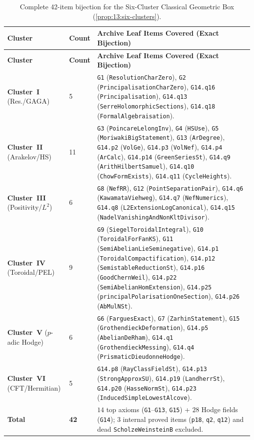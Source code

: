 \begin{longtable}{@{}llp{8.8cm}@{}}
\caption{Complete 42-item bijection for the Six-Cluster Classical Geometric Box (\cref{prop:13:six-clusters}).}
\label{tab:appA:geom42}\\
\toprule
\textbf{Cluster} & \textbf{Count} & \textbf{Archive Leaf Items Covered (Exact Bijection)} \\
\midrule
\endfirsthead
\toprule
\textbf{Cluster} & \textbf{Count} & \textbf{Archive Leaf Items Covered (Exact Bijection)} \\
\midrule
\endhead
\textbf{Cluster~I} (Res./GAGA) & 5 & \texttt{G1} (\texttt{ResolutionCharZero}), \texttt{G2} (\texttt{PrincipalisationCharZero}), \texttt{G14.q16} (\texttt{Principalisation}), \texttt{G14.q13} (\texttt{SerreHolomorphicSections}), \texttt{G14.q18} (\texttt{FormalAlgebraisation}). \\
\textbf{Cluster~II} (Arakelov/HS) & 11 & \texttt{G3} (\texttt{PoincareLelongInv}), \texttt{G4} (\texttt{HSUse}), \texttt{G5} (\texttt{MoriwakiBigStatement}), \texttt{G13} (\texttt{ArDegree}), \texttt{G14.p2} (\texttt{VolGe}), \texttt{G14.p3} (\texttt{VolNef}), \texttt{G14.p4} (\texttt{ArCalc}), \texttt{G14.p14} (\texttt{GreenSeriesSt}), \texttt{G14.q9} (\texttt{ArithHilbertSamuel}), \texttt{G14.q10} (\texttt{ChowFormExists}), \texttt{G14.q11} (\texttt{CycleHeights}). \\
\textbf{Cluster~III} (Positivity/$L^2$) & 6 & \texttt{G8} (\texttt{NefRR}), \texttt{G12} (\texttt{PointSeparationPair}), \texttt{G14.q6} (\texttt{KawamataViehweg}), \texttt{G14.q7} (\texttt{NefNumerics}), \texttt{G14.q8} (\texttt{L2ExtensionLogCanonical}), \texttt{G14.q15} (\texttt{NadelVanishingAndNonKltDivisor}). \\
\textbf{Cluster~IV} (Toroidal/PEL) & 9 & \texttt{G9} (\texttt{SiegelToroidalIntegral}), \texttt{G10} (\texttt{ToroidalForFanKS}), \texttt{G11} (\texttt{SemiAbelianLieSeminegative}), \texttt{G14.p1} (\texttt{ToroidalCompactification}), \texttt{G14.p12} (\texttt{SemistableReductionSt}), \texttt{G14.p16} (\texttt{GoodChernWeil}), \texttt{G14.p22} (\texttt{SemiAbelianHomExtension}), \texttt{G14.p25} (\texttt{principalPolarisationOneSection}), \texttt{G14.p26} (\texttt{AbMulNSt}). \\
\textbf{Cluster~V} ($p$-adic Hodge) & 6 & \texttt{G6} (\texttt{FarguesExact}), \texttt{G7} (\texttt{ZarhinStatement}), \texttt{G15} (\texttt{GrothendieckDeformation}), \texttt{G14.p5} (\texttt{AbelianDeRham}), \texttt{G14.q1} (\texttt{GrothendieckMessing}), \texttt{G14.q4} (\texttt{PrismaticDieudonneHodge}). \\
\textbf{Cluster~VI} (CFT/Hermitian) & 5 & \texttt{G14.p8} (\texttt{RayClassFieldSt}), \texttt{G14.p13} (\texttt{StrongApproxSU}), \texttt{G14.p19} (\texttt{LandherrSt}), \texttt{G14.p20} (\texttt{HasseNormSt}), \texttt{G14.p23} (\texttt{InducedSimpleLowestAlcove}). \\
\midrule
\textbf{Total} & \textbf{42} & $14$ top axioms (\texttt{G1}--\texttt{G13}, \texttt{G15}) + $28$ Hodge fields (\texttt{G14}); $3$ internal proved items (\texttt{p18}, \texttt{q2}, \texttt{q12}) and dead \texttt{ScholzeWeinsteinB} excluded. \\
\bottomrule
\end{longtable}

